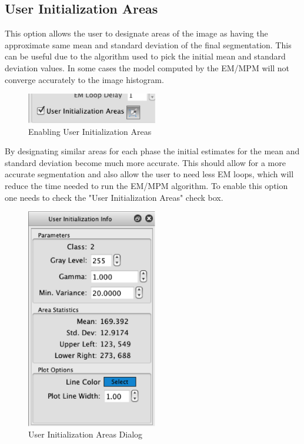 \documentclass[12pt,oneside]{book}
\begin{document}
\subsection{User Initialization Areas}
This option allows the user to designate areas of the image as having the approximate same mean and standard deviation of the final segmentation. This can be useful due to the algorithm used to pick the initial mean and standard deviation values. In some cases the model computed by the EM/MPM will not converge accurately to the image histogram.
 


\begin{figure}[htbp]
\begin{center}
\includegraphics[width=2.25in]{images/Untitled8.png}
\caption{Enabling User Initialization Areas}
\label{image8}
\end{center}
\end{figure}

By designating similar areas for each phase the initial estimates for the mean and standard deviation become much more accurate. This should allow for a more accurate segmentation and also allow the user to need less EM loops, which will reduce the time needed to run the EM/MPM algorithm. To enable this option one needs to check the "User Initialization Areas" check box.
 

\begin{figure}[htbp]
\begin{center}
\includegraphics[width=2.25in]{images/Untitled9.png}
\caption{User Initialization Areas Dialog}
\label{image9}
\end{center}
\end{figure}
\end{document}
